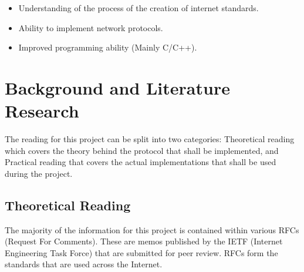 \documentclass[12pt]{report}
\begin{document}
\begin{itemize}
	\item Understanding of the process of the creation of internet standards.
	\item Ability to implement network protocols. 
	\item Improved programming ability (Mainly C/C++).
\end{itemize}

\chapter{Background and Literature Research}

The reading for this project can be split into two categories:
Theoretical reading which covers the theory behind the protocol that 
shall be implemented, and Practical reading that covers the actual implementations
that shall be used during the project.

\section{Theoretical Reading}
The majority of the information for this project is contained within various RFCs (Request For Comments).
These are memos published by the IETF (Internet Engineering Task Force) that are submitted for peer review.
RFCs form the standards that are used across the Internet.
\end{document}
